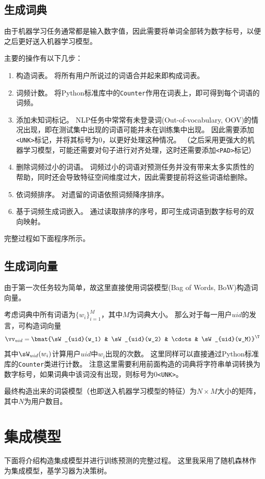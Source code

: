 \documentclass[logo,reportComp]{thesis}
\begin{document}
\subsection{生成词典}
由于机器学习任务通常都是输入数字值，因此需要将单词全部转为数字标号，以便之后更好送入机器学习模型。

主要的操作有以下几步：
\begin{enumerate}
	\item 构造词表。
	将所有用户所说过的词语合并起来即构成词表。
	\item 词频计数。
	将Python标准库中的\verb'Counter'作用在词表上，即可得到每个词语的词频。
	\item 添加未知词标记。
	NLP任务中常常有未登录词(Out-of-vocabulary, OOV)的情况出现，即在测试集中出现的词语可能并未在训练集中出现。
	因此需要添加\verb'<UNK>'标记，并将其标号为$0$，以更好处理这种情况。
	（之后采用更强大的机器学习模型，可能还需要对句子进行对齐处理，这时还需要添加\verb'<PAD>'标记）
	\item 删除词频过小的词语。
	词频过小的词语对预测任务并没有带来太多实质性的帮助，同时还会导致特征空间维度过大，因此需要提前将这些词语给删除。
	\item 依词频排序。
	对遗留的词语依照词频降序排序。
	\item 基于词频生成词嵌入。
	通过读取排序的序号，即可生成词语到数字标号的双向映射。
\end{enumerate}

完整过程如下面程序所示。


\subsection{生成词向量}
由于第一次任务较为简单，故这里直接使用词袋模型(Bag of Words, BoW)\cite{bib:bow}构造词向量。

考虑词典中所有词语为$\{w_i\}_{i=1}^M$，其中$M$为词典大小。
那么对于每一用户$uid$的发言，可构造词向量
\[\vv_{uid}=\bmat{\sW_{uid}(w_1) & \sW_{uid}(w_2) & \cdots & \sW_{uid}(w_M)}^\T\]
其中$\sW_{uid}(w_i)$计算用户$uid$中$w_i$出现的次数。
这里同样可以直接通过Python标准库的\verb'Counter'类进行计数。
注意这里需要利用前面构造的词典将字符串单词转换为数字标号，如果词典中该词没有出现，则标号为$0$\verb'<UNK>'。

最终构造出来的词袋模型（也即送入机器学习模型的特征）为$N\times M$大小的矩阵，其中$N$为用户数目。

\section{集成模型}
下面将介绍构造集成模型并进行训练预测的完整过程。
这里我采用了随机森林作为集成模型，基学习器为决策树。
\end{document}
